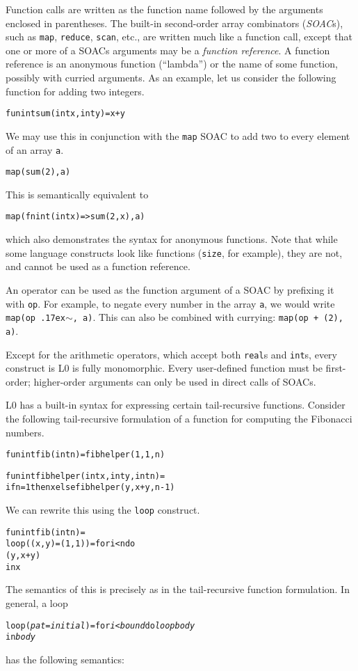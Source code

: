 \documentclass[oneside]{memoir}
\newcommand\realt[0]{\texttt{real}}
\newcommand\intt[0]{\texttt{int}}
\renewcommand\tilde[0]{{\raise.17ex\hbox{$\scriptstyle\sim$}}}
\begin{document}
Function calls are written as the function name followed by the
arguments enclosed in parentheses.  The built-in second-order array
combinators (\emph{SOAC}s), such as \texttt{map}, \texttt{reduce}, \texttt{scan}, etc., 
are written much like a function call,
except that one or more of a SOACs arguments may be a \emph{function
  reference}.  A function reference is an anonymous function
(``lambda'') or the name of some function, possibly with curried
arguments.  As an example, let us consider the following function for
adding two integers.
\begin{alltt}
fun int sum(int x, int y) = x + y
\end{alltt}
We may use this in conjunction with the \texttt{map} SOAC to add two
to every element of an array \texttt{a}.
\begin{alltt}
map(sum (2), a)
\end{alltt}
This is semantically equivalent to
\begin{alltt}
map(fn int (int x) => sum(2, x), a)
\end{alltt}
which also demonstrates the syntax for anonymous functions.  Note that
while some language constructs look like functions (\texttt{size}, for
example), they are not, and cannot be used as a function reference.

An operator can be used as the function argument of a SOAC by
prefixing it with \texttt{op}.  For example, to negate every number in
the array \texttt{a}, we would write \texttt{map(op \tilde{}, a)}.
This can also be combined with currying: \texttt{map(op + (2), a)}.

Except for the arithmetic operators, which accept both \realt{}s
and \intt{}s, every construct is L0 is fully monomorphic.  Every
user-defined function must be first-order; higher-order arguments can
only be used in direct calls of SOACs.

L0 has a built-in syntax for expressing certain tail-recursive
functions.  Consider the following tail-recursive formulation of a
function for computing the Fibonacci numbers.
\begin{alltt}
  fun int fib(int n) = fibhelper(1,1,n)

  fun int fibhelper(int x, int y, int n) =
    if n = 1 then x else fibhelper(y, x+y, n-1)
\end{alltt}
We can rewrite this using the \texttt{loop} construct.
\begin{alltt}
  fun int fib(int n) =
    loop ((x, y) = (1,1)) = for i < n do
                              (y, x+y)
    in x
\end{alltt}
The semantics of this is precisely as in the tail-recursive function
formulation.  In general, a loop
\begin{alltt}
  loop (\emph{pat} = \emph{initial}) = for \emph{i} < \emph{bound} do \emph{loopbody}
  in \emph{body}
\end{alltt}
has the following semantics:
\end{document}
